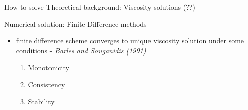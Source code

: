 \documentclass[10pt]{beamer} %
\theoremstyle{plain}
\theoremstyle{definition}
\theoremstyle{remark}
\begin{document}
\begin{frame}{How to solve}{}  
\alert{Theoretical background:} Viscosity solutions (??)

\bigskip \bigskip

\alert{Numerical solution\quad  \quad :} Finite Difference methods \medskip
\begin{itemize}
    \item finite difference scheme converges to unique viscosity solution under
    some conditions - \emph{Barles and Souganidis (1991)}

    \begin{enumerate}
        \item Monotonicity \smallskip
        \item Consistency  \smallskip
        \item Stability    \smallskip
    \end{enumerate}
\end{itemize}
\end{frame}
\end{document}
